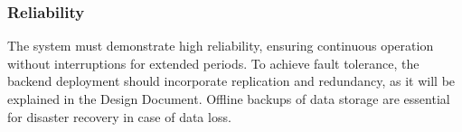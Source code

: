 \subsubsection{Reliability}
The \app system must demonstrate high reliability, ensuring continuous operation without interruptions for extended periods. To achieve fault tolerance, the backend deployment should incorporate replication and redundancy, as it will be explained in the Design Document. Offline backups of data storage are essential for disaster recovery in case of data loss.

